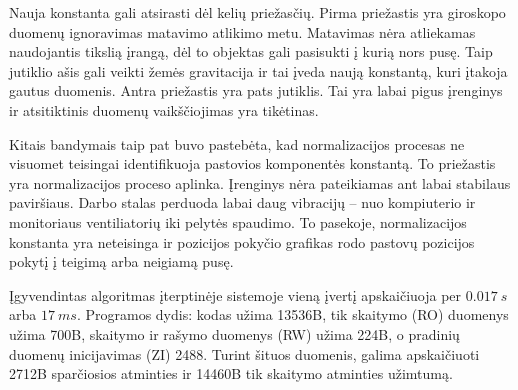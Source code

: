 Nauja konstanta gali atsirasti dėl kelių priežasčių.
Pirma priežastis yra giroskopo duomenų ignoravimas matavimo atlikimo metu.
Matavimas nėra atliekamas naudojantis tikslią įrangą, dėl to objektas gali pasisukti į kurią nors pusę.
Taip jutiklio ašis gali veikti žemės gravitacija ir tai įveda naują konstantą, kuri įtakoja gautus duomenis.
Antra priežastis yra pats jutiklis.
Tai yra labai pigus įrenginys ir atsitiktinis duomenų vaikščiojimas yra tikėtinas.

Kitais bandymais taip pat buvo pastebėta, kad normalizacijos procesas ne visuomet teisingai identifikuoja pastovios komponentės konstantą.
To priežastis yra normalizacijos proceso aplinka.
Įrenginys nėra pateikiamas ant labai stabilaus paviršiaus.
Darbo stalas perduoda labai daug vibracijų -- nuo kompiuterio ir monitoriaus ventiliatorių iki pelytės spaudimo.
To pasekoje, normalizacijos konstanta yra neteisinga ir pozicijos pokyčio grafikas rodo pastovų pozicijos pokytį į teigimą arba neigiamą pusę.

Įgyvendintas algoritmas įterptinėje sistemoje vieną įvertį apskaičiuoja per $0.017~s$ arba $17~ms$.
Programos dydis: kodas užima 13536B, tik skaitymo (RO) duomenys užima 700B, skaitymo ir rašymo duomenys (RW) užima 224B, o pradinių duomenų inicijavimas (ZI) 2488.
Turint šituos duomenis, galima apskaičiuoti 2712B sparčiosios atminties ir 14460B tik skaitymo atminties užimtumą.

